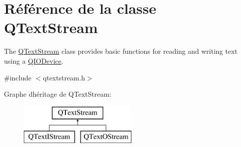 \hypertarget{class_q_text_stream}{}\section{Référence de la classe Q\+Text\+Stream}
\label{class_q_text_stream}


The \hyperlink{class_q_text_stream}{Q\+Text\+Stream} class provides basic functions for reading and writing text using a \hyperlink{class_q_i_o_device}{Q\+I\+O\+Device}.  




{\ttfamily \#include $<$qtextstream.\+h$>$}

Graphe d\textquotesingle{}héritage de Q\+Text\+Stream\+:\begin{figure}[H]
\begin{center}
\leavevmode
\includegraphics[height=2.000000cm]{class_q_text_stream}
\end{center}
\end{figure}

